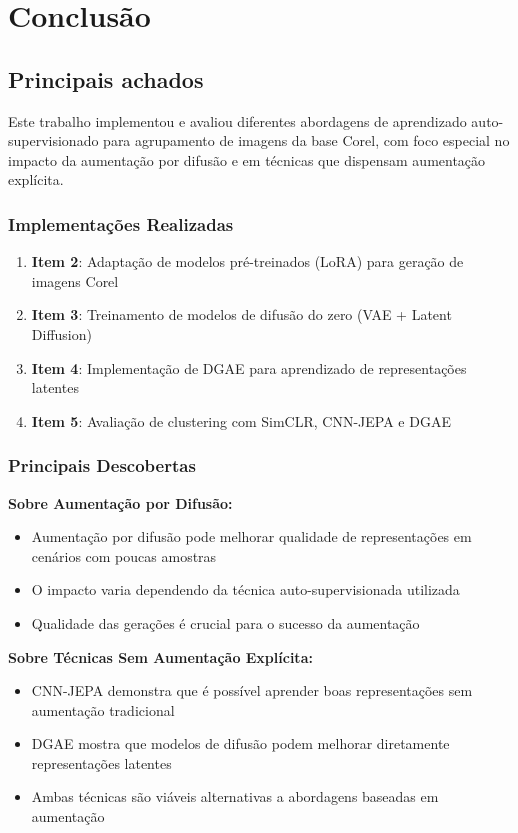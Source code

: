 \chapter{Conclusão}

\section{Principais achados}

Este trabalho implementou e avaliou diferentes abordagens de aprendizado auto-supervisionado para agrupamento de imagens da base Corel, com foco especial no impacto da aumentação por difusão e em técnicas que dispensam aumentação explícita.

\subsection{Implementações Realizadas}

\begin{enumerate}
    \item \textbf{Item 2}: Adaptação de modelos pré-treinados (LoRA) para geração de imagens Corel
    \item \textbf{Item 3}: Treinamento de modelos de difusão do zero (VAE + Latent Diffusion)
    \item \textbf{Item 4}: Implementação de DGAE para aprendizado de representações latentes
    \item \textbf{Item 5}: Avaliação de clustering com SimCLR, CNN-JEPA e DGAE
\end{enumerate}

\subsection{Principais Descobertas}

\textbf{Sobre Aumentação por Difusão:}
\begin{itemize}
    \item Aumentação por difusão pode melhorar qualidade de representações em cenários com poucas amostras
    \item O impacto varia dependendo da técnica auto-supervisionada utilizada
    \item Qualidade das gerações é crucial para o sucesso da aumentação
\end{itemize}

\textbf{Sobre Técnicas Sem Aumentação Explícita:}
\begin{itemize}
    \item CNN-JEPA demonstra que é possível aprender boas representações sem aumentação tradicional
    \item DGAE mostra que modelos de difusão podem melhorar diretamente representações latentes
    \item Ambas técnicas são viáveis alternativas a abordagens baseadas em aumentação
\end{itemize}

